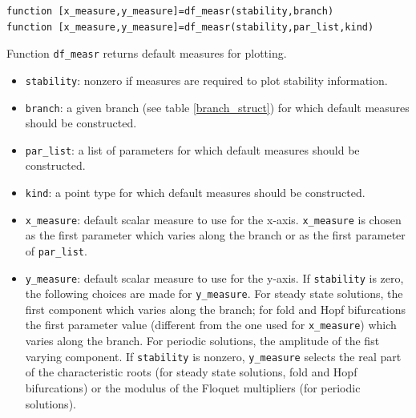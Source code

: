 \documentclass[10pt]{scrartcl}
\newcommand{\blist}[1]{\mbox{\lstinline!#1!}}
\begin{document}
{\begin{lstlisting}
function [x_measure,y_measure]=df_measr(stability,branch)
function [x_measure,y_measure]=df_measr(stability,par_list,kind)  
\end{lstlisting}
\noindent Function \blist{df_measr} returns default measures for
plotting.
\begin{itemize}
\item \blist{stability}: nonzero if measures are required to plot
  stability information.
\item \blist{branch}: a given branch (see table \ref{branch_struct})
  for which default measures should be constructed.
\item \blist{par_list}: a list of parameters for which default
  measures should be constructed.
\item \blist{kind}: a point type for which default measures should be
  constructed.
\item \blist{x_measure}: default scalar measure to use for the x-axis.
  \blist{x_measure} is chosen as the first parameter which varies
  along the branch or as the first parameter of \blist{par_list}.
\item \blist{y_measure}: default scalar measure to use for the y-axis.
  If \blist{stability} is zero, the following choices are made for
  \blist{y_measure}. For steady state solutions, the first component
  which varies along the branch; for fold and Hopf bifurcations the
  first parameter value (different from the one used for
  \blist{x_measure}) which varies along the branch. For periodic
  solutions, the amplitude of the fist varying component.  If
  \blist{stability} is nonzero, \blist{y_measure} selects the real
  part of the characteristic roots (for steady state solutions, fold
  and Hopf bifurcations) or the modulus of the Floquet multipliers
  (for periodic solutions).
\end{itemize}

}
\end{document}
